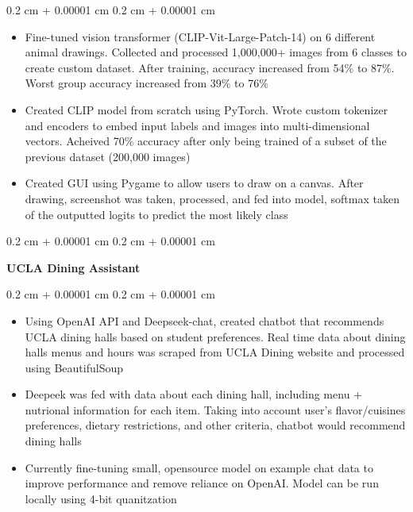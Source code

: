 \documentclass[10pt, letterpaper]{article}
\newenvironment{highlights}{
    \begin{itemize}[
        topsep=0.10 cm,
        parsep=0.10 cm,
        partopsep=0pt,
        itemsep=0pt,
        leftmargin=0.4 cm + 10pt
    ]
}{
    \end{itemize}
} %
\newenvironment{onecolentry}{
    \begin{adjustwidth}{
        0.2 cm + 0.00001 cm
    }{
        0.2 cm + 0.00001 cm
    }
}{
    \end{adjustwidth}
} %
\newenvironment{twocolentry}[2][]{
    \onecolentry
    \def\secondColumn{#2}
    \setcolumnwidth{\fill, 4.5 cm}
    \begin{paracol}{2}
}{
    \switchcolumn \raggedleft \secondColumn
    \end{paracol}
    \endonecolentry
} %
\let\hrefWithoutArrow\href
\renewcommand{\href}[2]{\hrefWithoutArrow{#1}{\ifthenelse{\equal{#2}{}}{ }{#2 }\raisebox{.15ex}{\footnotesize \faExternalLink*}}}
\begin{document}
        \vspace{0.10 cm}
        \begin{onecolentry}
            \begin{highlights}
            \item{Fine-tuned vision transformer (CLIP-Vit-Large-Patch-14) on 6 different animal drawings. Collected and processed 1,000,000+ images from 6 classes to create custom dataset. After training, accuracy increased from 54$\%$ to 87$\%$. Worst group accuracy increased from 39$\%$ to 76$\%$}
            \item{Created CLIP model from scratch using PyTorch. Wrote custom tokenizer and encoders to embed input labels and images into multi-dimensional vectors. Acheived 70$\%$ accuracy after only being trained of a subset of the previous dataset (200,000 images)}
            \item{Created GUI using Pygame to allow users to draw on a canvas. After drawing, screenshot was taken, processed, and fed into model, softmax taken of the outputted logits to predict the most likely class}
            \end{highlights}
        \end{onecolentry}


        \vspace{0.2 cm}

        \begin{twocolentry}{
            
            
        \textit{\href{https://github.com/giyushino/whatToEatAtUCLA}{What2Eat@UCLA}}}
        \textbf{UCLA Dining Assistant}
        \end{twocolentry}

        \vspace{0.10 cm}
        \begin{onecolentry}
            \begin{highlights}
            \item{Using OpenAI API and Deepseek-chat, created chatbot that recommends UCLA dining halls based on student preferences. Real time data about dining halls menus and hours was scraped from UCLA Dining website and processed using BeautifulSoup}
            \item{Deepeek was fed with data about each dining hall, including menu + nutrional information for each item. Taking into account user's flavor/cuisines preferences, dietary restrictions, and other criteria, chatbot would recommend dining halls}
            \item{Currently fine-tuning small, opensource model on example chat data to improve performance and remove reliance on OpenAI. Model can be run locally using 4-bit quanitzation}
            \end{highlights}
        \end{onecolentry}
\end{document}
